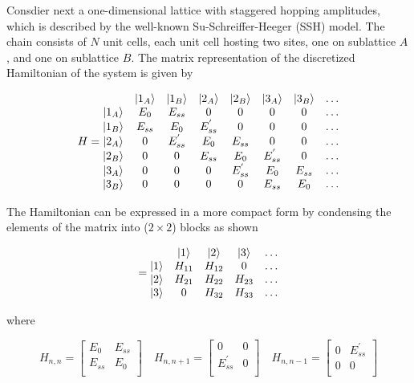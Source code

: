 \vspace{1cm}

Consdier next a one-dimensional lattice with staggered hopping amplitudes, which is described by the well-known Su-Schreiffer-Heeger (SSH) model. The chain consists of $N$ unit cells, each unit cell hosting two sites, one on sublattice $A$, and one on sublattice $B$. The matrix representation of the discretized Hamiltonian of the system is given by

\begin{equation}
   H = \begin{matrix}
     & \ket{1_A} & \ket{1_B} & \ket{2_A} & \ket{2_B} & \ket{3_A} & \ket{3_B} & \ldots\\
    \ket{1_A} & E_0 & E_{ss} & 0 & 0 & 0 & 0 & \ldots \\
    \ket{1_B} & E_{ss} & E_0 & E_{ss}^{'} & 0 & 0 & 0 & \ldots \\
    \ket{2_A} & 0 & E_{ss}^{'} & E_0 & E_{ss} & 0 & 0 & \ldots \\
    \ket{2_B} & 0 & 0 & E_{ss} & E_0 & E_{ss}^{'} & 0 & \ldots \\
    \ket{3_A} & 0 & 0 & 0 & E_{ss}^{'} & E_0 & E_{ss} & \ldots \\
    \ket{3_B} & 0 & 0 & 0 & 0 & E_{ss} & E_{0} & \ldots \\        
    \end{matrix}
\end{equation}

The Hamiltonian can be expressed in a more compact form by condensing the elements of the matrix into ($2\times 2$) blocks as shown

\begin{equation}
[H] =
\begin{matrix}
     & \ket{1} & \ket{2} & \ket{3} & \ldots \\
    \ket{1} & H_{11} & H_{12} & 0 & \ldots \\
    \ket{2} & H_{21} & H_{22} & H_{23} & \ldots \\
    \ket{3} & 0 & H_{32} & H_{33} & \ldots \\
\end{matrix}   
\end{equation}

where

\begin{equation*}
H_{n,n} =
\begin{bmatrix}
    E_{0} & E_{ss} \\
    E_{ss} & E_{0} \\
\end{bmatrix}  \quad
H_{n,n+1} =
\begin{bmatrix}
    0 & 0 \\
    E_{ss}^{'} & 0 \\
\end{bmatrix}  \quad
H_{n,n-1} =
\begin{bmatrix}
    0 & E_{ss}^{'} \\
    0 & 0 \\
\end{bmatrix}  
\end{equation*}

